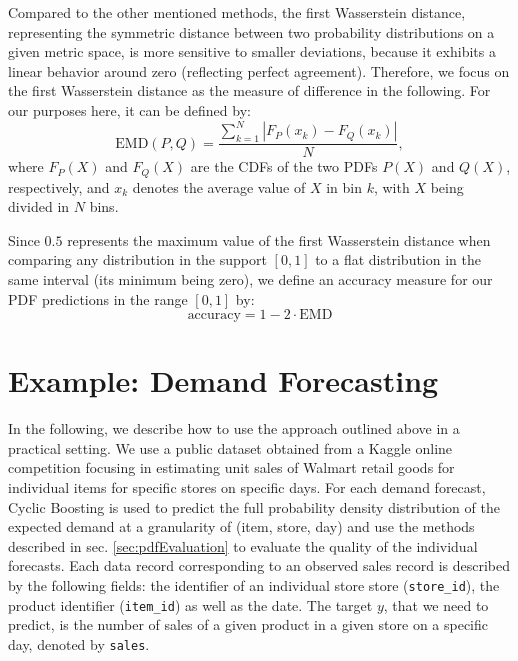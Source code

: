 \documentclass[BCOR=1mm, DIV=calc,10pt,
twoside=true,
twocolumn,
headings=normal]{scrartcl}
\begin{document}
Compared to the other mentioned methods, the first Wasserstein distance, representing the symmetric distance between two probability distributions on a given metric space, is more sensitive to smaller deviations, because it exhibits a linear behavior around zero (reflecting perfect agreement). Therefore, we focus on the first Wasserstein distance as the measure of difference in the following. For our purposes here, it can be defined by:
\begin{equation}
\text{EMD}(P, Q) = \frac{\sum_{k=1}^N |F_P(x_k) - F_Q(x_k)|}{N},
\end{equation}
where $F_P(X)$ and $F_Q(X)$ are the CDFs of the two PDFs $P(X)$ and $Q(X)$, respectively, and $x_k$ denotes the average value of $X$ in bin $k$, with $X$ being divided in $N$ bins.

Since $0.5$ represents the maximum value of the first Wasserstein distance when comparing any distribution in the support $[0, 1]$ to a flat distribution in the same interval (its minimum being zero), we define an accuracy measure for our PDF predictions in the range $[0, 1]$ by:
\begin{equation}
\text{accuracy} = 1 - 2 \cdot \text{EMD}
\end{equation}


\section{Example: Demand Forecasting}
\label{sec:example}

In the following, we describe how to use the approach outlined above in a practical setting. We use a public dataset obtained from a Kaggle online competition focusing in estimating unit sales of Walmart retail goods \cite{kaggle_data} for individual items for specific stores on specific days. For each demand forecast, Cyclic Boosting is used to predict the full probability density distribution of the expected demand at a granularity of (item, store, day) and use the methods described in sec. \ref{sec:pdfEvaluation} to evaluate the quality of the individual forecasts. Each data record corresponding to an observed sales record is described by the following fields: the identifier of an individual store store (\texttt{store\_id}), the product identifier (\texttt{item\_id}) as well as the date. The target $y$, that we need to predict, is the number of sales of a given product in a given store on a specific day, denoted by \texttt{sales}.
\end{document}
